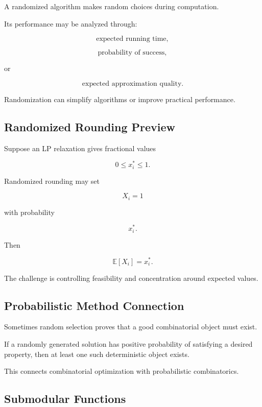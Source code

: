 A randomized algorithm makes random choices during computation.

Its performance may be analyzed through:

\[
\boxed{
\text{expected running time},
}
\]

\[
\boxed{
\text{probability of success},
}
\]

or

\[
\boxed{
\text{expected approximation quality}.
}
\]

Randomization can simplify algorithms or improve practical performance.

\subsection{Randomized Rounding Preview}
\label{subsec:randomized-rounding-preview}

Suppose an LP relaxation gives fractional values

\[
0\leq x_i^*\leq1.
\]

Randomized rounding may set

\[
X_i
=
1
\]

with probability

\[
\boxed{
x_i^*.
}
\]

Then

\[
\boxed{
\mathbb{E}[X_i]
=
x_i^*.
}
\]

The challenge is controlling feasibility and concentration around expected
values.

\subsection{Probabilistic Method Connection}
\label{subsec:probabilistic-method-combinatorial}

Sometimes random selection proves that a good combinatorial object must
exist.

If a randomly generated solution has positive probability of satisfying
a desired property, then at least one such deterministic object exists.

This connects combinatorial optimization with probabilistic combinatorics.

\subsection{Submodular Functions}
\label{subsec:submodular-functions-optimization}

